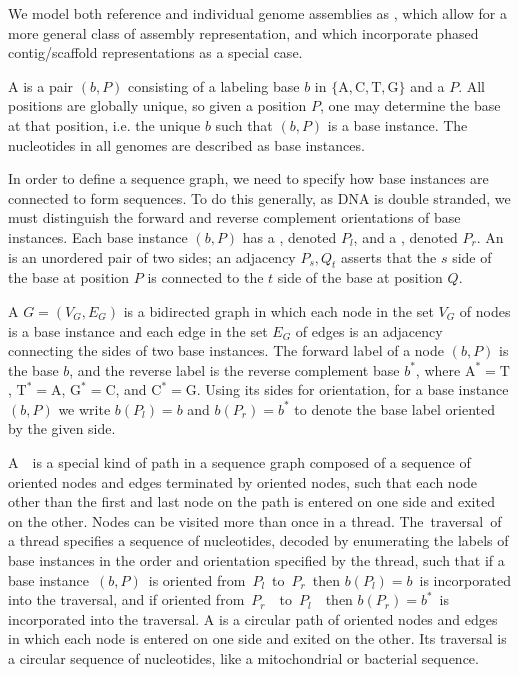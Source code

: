 \documentclass[11pt,proposal]{ucthesis}
\begin{document}
We model both reference and individual genome assemblies as , which allow for a more general class of assembly representation, and which incorporate phased contig/scaffold representations as a special case. 

A  is a pair $(b,P)$ consisting of a labeling base $b$ in $\{\mathrm{A},\mathrm{C},\mathrm{T},\mathrm{G}\}$ and a  $P$. All positions are globally unique, so given a position $P$, one may determine the base at that position, i.e. the unique $b$ such that $(b,P)$ is a base instance. The nucleotides in all genomes are described as base instances. 

In order to define a sequence graph, we need to specify how base instances are connected to form sequences. To do this generally, as DNA is double stranded, we must distinguish the forward and reverse complement orientations of base instances. Each base instance $(b,P)$ has a , denoted $P_l$, and a , denoted $P_r$. An  is an unordered pair of two sides; an adjacency ${P_s, Q_t}$ asserts that the $s$ side of the base at position $P$ is connected to the $t$ side of the base at position $Q$. 

A  $G = (V_G,E_G)$ is a bidirected graph \cite{medvedev2009maximum} in which each node in the set $V_G$ of nodes is a base instance and each edge in the set $E_G$ of edges is an adjacency connecting the sides of two base instances. The forward label of a node $(b,P)$ is the base $b$, and the reverse label is the reverse complement base $b^*$, where $\mathrm{A}^* = \mathrm{T}$, $\mathrm{T}^* = \mathrm{A}$, $\mathrm{G}^* = \mathrm{C}$, and $\mathrm{C}^* = \mathrm{G}$. Using its sides for orientation, for a base instance $(b, P)$ we write $b(P_l) = b$ and $b(P_r) = b^*$ to denote the base label oriented by the given side.

A  is a special kind of path in a sequence graph composed of a sequence of oriented nodes and edges terminated by oriented nodes, such that each node other than the first and last node on the path is entered on one side and exited on the other. Nodes can be visited more than once in a thread. The traversal of a thread specifies a sequence of nucleotides, decoded by enumerating the labels of base instances in the order and orientation specified by the thread, such that if a base instance $(b, P)$ is oriented from $P_l$ to $P_r$ then $b(P_l) = b$ is incorporated into the traversal, and if oriented from $P_r$  to $P_l$  then $b(P_r) = b^*$ is incorporated into the traversal. A  is a circular path of oriented nodes and edges in which each node is entered on one side and exited on the other. Its traversal is a circular sequence of nucleotides, like a mitochondrial or bacterial sequence.  
\end{document}
